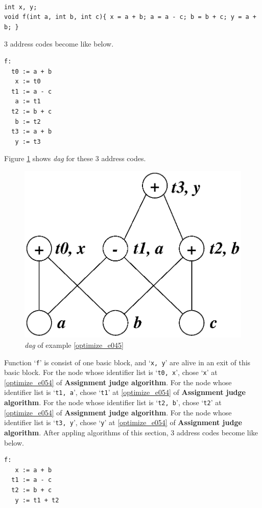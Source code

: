 \begin{Example}
\label{optimize_e045}
\begin{verbatim}

int x, y;
void f(int a, int b, int c){ x = a + b; a = a - c; b = b + c; y = a + b; }
\end{verbatim}
3 address codes become like below.
\begin{verbatim}
f:
  t0 := a + b
   x := t0
  t1 := a - c
   a := t1
  t2 := b + c
   b := t2
  t3 := a + b
   y := t3
\end{verbatim}
Figure \ref{optimize_e046} shows {\em dag} for these 3 address codes.
\begin{figure}[htbp]
\begin{center}
\includegraphics[width=0.7\linewidth,height=0.540\linewidth]{opt024.eps}
\caption{{\em dag} of example \ref{optimize_e045}}
\label{optimize_e046}
\end{center}
\end{figure}
Function `{\tt{f}}' is consist of one basic block, and 
`{\tt{x, y}}' are alive in an exit of this basic block.
For the node whose identifier list is `{\tt{t0, x}}',
chose `{\tt{x}}' at \ref{optimize_e054} of {\bf Assignment judge algorithm}.
For the node whose identifier list is `{\tt{t1, a}}',
chose `{\tt{t1}}' at \ref{optimize_e054} of {\bf Assignment judge algorithm}.
For the node whose identifier list is `{\tt{t2, b}}',
chose `{\tt{t2}}' at \ref{optimize_e054} of {\bf Assignment judge algorithm}.
For the node whose identifier list is `{\tt{t3, y}}',
chose `{\tt{y}}' at \ref{optimize_e054} of {\bf Assignment judge algorithm}.
After appling algorithms of this section,
3 address codes become like below.
\begin{verbatim}
f:
   x := a + b
  t1 := a - c
  t2 := b + c
   y := t1 + t2
\end{verbatim}
\end{Example}

